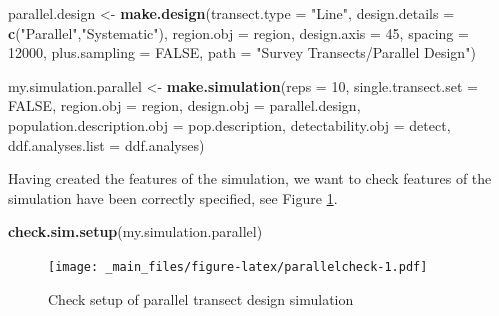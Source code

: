 \documentclass[]{book}
\newenvironment{Shaded}{\begin{snugshade}}{\end{snugshade}}
\newcommand{\KeywordTok}[1]{\textcolor[rgb]{0.13,0.29,0.53}{\textbf{#1}}}
\newcommand{\DataTypeTok}[1]{\textcolor[rgb]{0.13,0.29,0.53}{#1}}
\newcommand{\DecValTok}[1]{\textcolor[rgb]{0.00,0.00,0.81}{#1}}
\newcommand{\StringTok}[1]{\textcolor[rgb]{0.31,0.60,0.02}{#1}}
\newcommand{\OtherTok}[1]{\textcolor[rgb]{0.56,0.35,0.01}{#1}}
\newcommand{\NormalTok}[1]{#1}
\theoremstyle{definition}
\theoremstyle{definition}
\theoremstyle{remark}
\begin{document}
\begin{Shaded}
\begin{Highlighting}[]
\NormalTok{parallel.design <-}\StringTok{ }\KeywordTok{make.design}\NormalTok{(}\DataTypeTok{transect.type =} \StringTok{"Line"}\NormalTok{,}
                               \DataTypeTok{design.details =} \KeywordTok{c}\NormalTok{(}\StringTok{"Parallel"}\NormalTok{,}\StringTok{"Systematic"}\NormalTok{),}
                               \DataTypeTok{region.obj =}\NormalTok{ region, }\DataTypeTok{design.axis =} \DecValTok{45}\NormalTok{,}
                               \DataTypeTok{spacing =} \DecValTok{12000}\NormalTok{, }\DataTypeTok{plus.sampling =} \OtherTok{FALSE}\NormalTok{,}
                               \DataTypeTok{path =} \StringTok{"Survey Transects/Parallel Design"}\NormalTok{)}

\NormalTok{my.simulation.parallel <-}\StringTok{ }\KeywordTok{make.simulation}\NormalTok{(}\DataTypeTok{reps =} \DecValTok{10}\NormalTok{, }
                                          \DataTypeTok{single.transect.set =} \OtherTok{FALSE}\NormalTok{, }
                                          \DataTypeTok{region.obj =}\NormalTok{ region, }
                                          \DataTypeTok{design.obj =}\NormalTok{ parallel.design, }
                                          \DataTypeTok{population.description.obj =}\NormalTok{ pop.description,}
                                          \DataTypeTok{detectability.obj =}\NormalTok{ detect,}
                                          \DataTypeTok{ddf.analyses.list =}\NormalTok{ ddf.analyses)}
\end{Highlighting}
\end{Shaded}

Having created the features of the simulation, we want to check features
of the simulation have been correctly specified, see Figure
\ref{fig:parallelcheck}.

\begin{Shaded}
\begin{Highlighting}[]
\KeywordTok{check.sim.setup}\NormalTok{(my.simulation.parallel)}
\end{Highlighting}
\end{Shaded}

\begin{figure}
\centering
\texttt{[image: \_main\_files/figure-latex/parallelcheck-1.pdf]}
\caption{\label{fig:parallelcheck}Check setup of parallel transect design
simulation}
\end{figure}
\end{document}
